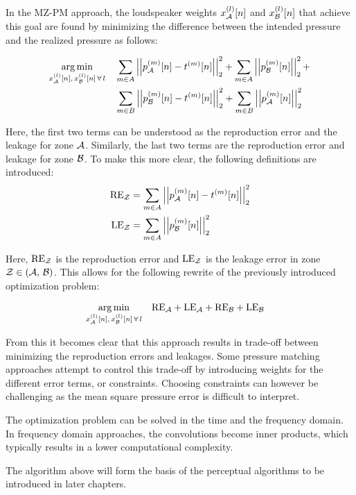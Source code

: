In the MZ-PM approach, the loudspeaker weights $x_{\mathcal{A}}^{(l)}[n]$ and $x_{\mathcal{B}}^{(l)}[n]$ that achieve this goal are found by 
minimizing the difference between the intended pressure and the realized pressure as follows:

\begin{align}
    \argmin{x_\za^{(l)}[n],\,x_\zb^{(l)}[n]\,\forall\,l}{
       &\sum_{m\in A} \norm[2][2]{p_\za^{(m)}[n] - t^{(m)}[n]} +
        \sum_{m\in A} \norm[2][2]{p_\zb^{(m)}[n]} + \\
       &\sum_{m\in B} \norm[2][2]{p_\zb^{(m)}[n] - t^{(m)}[n]} + 
        \sum_{m\in B} \norm[2][2]{p_\za^{(m)}[n]}
    }
\end{align}

Here, the first two terms can be understood as the reproduction error and the leakage for zone $\mathcal{A}$.
Similarly, the last two terms are the reproduction error and leakage for zone $\mathcal{B}$. 
To make this more clear, the following definitions are introduced:
\begin{align}
    \text{RE}_\zz &= \sum_{m\in A} \norm[2][2]{p_\za^{(m)}[n] - t^{(m)}[n]} \\
    \text{LE}_\zz &= \sum_{m\in A} \norm[2][2]{p_\zb^{(m)}[n]} 
\end{align}

Here, $\text{RE}_{\mathcal{Z}}$ is the reproduction error and $\text{LE}_{\mathcal{Z}}$ is the leakage error in zone $\mathcal{Z} \in \left(\mathcal{A},\,\mathcal{B}\right)$.
This allows for the following rewrite of the previously introduced optimization problem:

\begin{align}
    \argmin{x_\za^{(l)}[n],\,x_\zb^{(l)}[n]\,\forall\,l}{
       &\text{RE}_\za + \text{LE}_\za + \text{RE}_\zb + \text{LE}_\zb
    }
\end{align}

From this it becomes clear that this approach results in trade-off between minimizing the reproduction errors and leakages. 
Some pressure matching approaches attempt to control this trade-off by introducing weights for the different error terms, or constraints.
Choosing constraints can however be challenging as the mean square pressure error is difficult to interpret.

The optimization problem can be solved in the time and the frequency domain.
In frequency domain approaches, the convolutions become inner products, which typically results in a lower computational complexity.

The algorithm above will form the basis of the perceptual algorithms to be introduced in later chapters.
